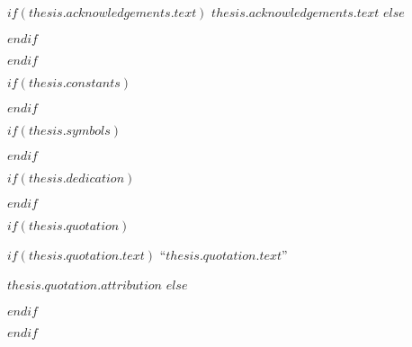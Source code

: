 \begin{acknowledgements}
\addchaptertocentry{\acknowledgementname} %
$if(thesis.acknowledgements.text)$
$thesis.acknowledgements.text$
$else$

$endif$
\end{acknowledgements}

$endif$

$if(thesis.constants)$



$endif$

$if(thesis.symbols)$



$endif$

$if(thesis.dedication)$

\dedicatory{} 

$endif$

$if(thesis.quotation)$
\vspace*{0.2\textheight}

$if(thesis.quotation.text)$
\noindent``{\itshape $thesis.quotation.text$}''\bigbreak

\hfill $thesis.quotation.attribution$
$else$

$endif$

$endif$



\pagestyle{plain} %
